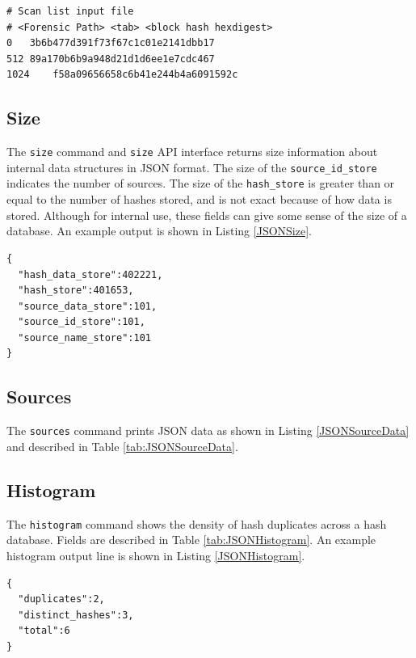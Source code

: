 \documentclass[11pt,fleqn]{article} %
\begin{document}
\lstset{style=customfile}
\begin{lstlisting}[float, caption={Example scan list input file}, label=ScanListFile]
# Scan list input file
# <Forensic Path> <tab> <block hash hexdigest>
0	3b6b477d391f73f67c1c01e2141dbb17
512	89a170b6b9a948d21d1d6ee1e7cdc467
1024	f58a09656658c6b41e244b4a6091592c
\end{lstlisting}

\subsection{Size}
The \hdb \verb+size+ command and \verb+size+ API interface returns size information about internal data structures in JSON format. The size of the \verb+source_id_store+ indicates the number of sources. The size of the \verb+hash_store+ is greater than or equal to the number of hashes stored, and is not exact because of how data is stored. Although for internal use, these fields can give some sense of the size of a \hdb database. An example output is shown in Listing \ref{JSONSize}.\\

\lstset{style=customfile}
\begin{lstlisting}[float, caption={Example JSON output of database size values}, label=JSONSize]
{
  "hash_data_store":402221,
  "hash_store":401653,
  "source_data_store":101,
  "source_id_store":101,
  "source_name_store":101
}
\end{lstlisting}

\subsection{Sources}
The \verb+sources+ command prints JSON data as shown in Listing \ref{JSONSourceData} and described in Table \ref{tab:JSONSourceData}.\\

\subsection{Histogram}
\label{Histogram}
The \verb+histogram+ command shows the density of hash duplicates across a hash database. Fields are described in Table \ref{tab:JSONHistogram}. An example histogram output line is shown in Listing \ref{JSONHistogram}.

\lstset{style=customfile}
\begin{lstlisting}[float, caption={Example JSON histogram format}, label=JSONHistogram]
{
  "duplicates":2,
  "distinct_hashes":3,
  "total":6
}
\end{lstlisting}
\end{document}
